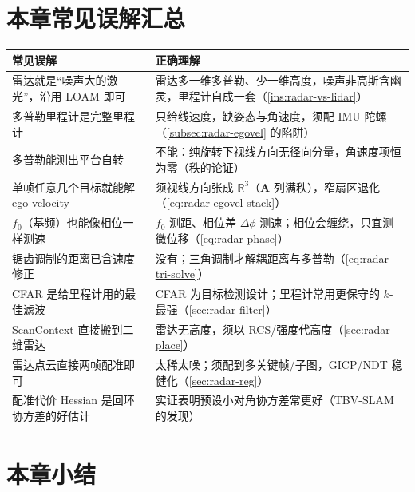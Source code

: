 \section*{本章常见误解汇总}
\begin{table}[H]\centering\small
\begin{tabular}{p{} p{}}
\toprule
\textbf{常见误解} & \textbf{正确理解} \\
\midrule
雷达就是“噪声大的激光”，沿用 LOAM 即可 & 雷达多一维多普勒、少一维高度，噪声非高斯含幽灵，里程计自成一套（\cref{ins:radar-vs-lidar}）\\
多普勒里程计是完整里程计 & 只给线速度，缺姿态与角速度，须配 IMU 陀螺（\cref{subsec:radar-egovel} 的陷阱）\\
多普勒能测出平台自转 & 不能：纯旋转下视线方向无径向分量，角速度项恒为零（秩的论证）\\
单帧任意几个目标就能解 ego-velocity & 须视线方向张成 $\mathbb R^3$（$\mathbf A$ 列满秩），窄扇区退化（\cref{eq:radar-egovel-stack}）\\
$f_0$（基频）也能像相位一样测速 & $f_0$ 测距、相位差 $\Delta\phi$ 测速；相位会缠绕，只宜测微位移（\cref{eq:radar-phase}）\\
锯齿调制的距离已含速度修正 & 没有；三角调制才解耦距离与多普勒（\cref{eq:radar-tri-solve}）\\
CFAR 是给里程计用的最佳滤波 & CFAR 为目标检测设计；里程计常用更保守的 $k$-最强（\cref{sec:radar-filter}）\\
ScanContext 直接搬到二维雷达 & 雷达无高度，须以 RCS/强度代高度（\cref{sec:radar-place}）\\
雷达点云直接两帧配准即可 & 太稀太噪；须配到多关键帧/子图，GICP/NDT 稳健化（\cref{sec:radar-reg}）\\
配准代价 Hessian 是回环协方差的好估计 & 实证表明预设小对角协方差常更好（TBV-SLAM 的发现）\\
\bottomrule
\end{tabular}
\end{table}

\section*{本章小结}

